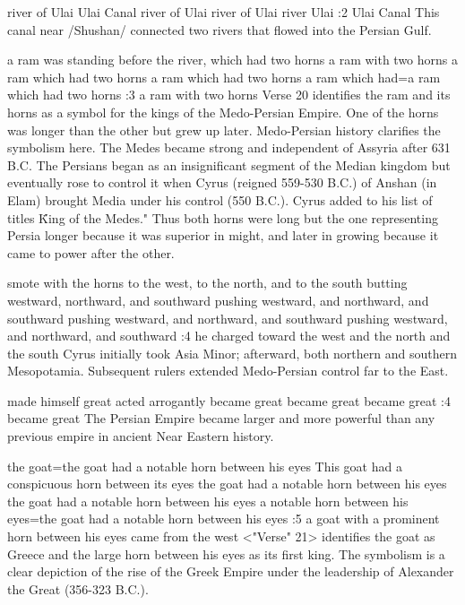     {river of Ulai} %
    {Ulai Canal} %
    {river of Ulai} %
    {river of Ulai} %
    {river Ulai} %
:2 {Ulai  Canal} This canal near \x/Shushan/ connected two rivers that flowed into 
the Persian Gulf.


    {a ram was standing before the river, which had two horns} %
    {a ram with two horns} %
    {a ram which had two horns} %
    {a ram which had two horns} %
    {a ram which had}={a ram which had two horns} %
:3 {a ram with two horns} Verse 20 identifies the ram and its horns as a symbol for the kings of the
Medo-Persian Empire. One of the horns was longer than the other but grew up later. Medo-Persian
history clarifies the symbolism here. The Medes became strong and independent of Assyria after 631
B.C. The Persians began as an insignificant segment of the Median kingdom but eventually rose to
control it when Cyrus (reigned 559-530 B.C.) of Anshan (in Elam) brought Media under his control
(550 B.C.). Cyrus  added to his list of titles \"King of the Medes." Thus both horns 
were long but the one representing Persia longer because it was 
superior in might, and later in growing because it came to power 
after the other.

    {smote with the horns to the west, to the north, and to the south} %
    {butting westward, northward, and southward} %
    {pushing westward, and northward, and southward} %
    {pushing westward, and northward, and southward} %
    {pushing westward, and northward, and southward} %
:4 {he charged toward the west and the north and the south}
Cyrus initially took Asia Minor; afterward, both northern and 
southern Mesopotamia. Subsequent rulers extended Medo-Persian control far to the East.

    {made himself great} %
    {acted arrogantly} %
    {became great} %
    {became great} %
    {became great} %
:4 {became great} The Persian Empire became larger and more powerful than any previous empire
in ancient Near Eastern history.

    {the goat}={the goat had a notable horn between his eyes} %
    {This goat had a conspicuous horn between its eyes} %
    {the goat had a notable horn between his eyes} %
    {the goat had a notable horn between his eyes} %
    {a notable horn between his eyes}={the goat had a notable horn between his eyes} %
:5 {a goat with a prominent horn between his eyes came from the west}
<"Verse" 21> identifies the goat as Greece and the 
large horn between his eyes as its first king. The symbolism is a 
clear depiction of the rise of the Greek Empire under the leadership of Alexander the Great (356-323 B.C.).

